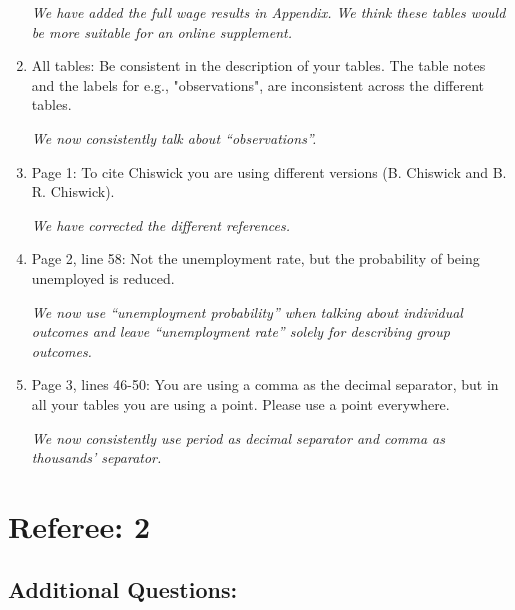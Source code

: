 \documentclass{article}
\newenvironment{response}
{\slshape}{}
\begin{document}
\begin{enumerate}
  \begin{response}
    We have added the full wage results in Appendix.  We think these
    tables would be more suitable for an online supplement.
  \end{response}
\item All tables: Be consistent in the description of your tables. The
table notes and the labels for e.g., "observations", are inconsistent
across the different tables. 

\begin{response}
  We now consistently talk about ``observations''.
\end{response}

\item Page 1: To cite Chiswick you are using different versions
(B. Chiswick and B. R. Chiswick).

\begin{response}
  We have corrected the different references.
\end{response}

\item Page 2, line 58: Not the unemployment rate, but the probability of
  being unemployed is reduced.

  \begin{response}
    We now use ``unemployment probability'' when talking about
    individual outcomes and leave ``unemployment rate'' solely for
    describing group outcomes.
  \end{response}

\item Page 3, lines 46-50: You are using a comma as the decimal separator, but in all your tables you are using a point. Please use a point everywhere. 

  \begin{response}
    We now consistently use period as decimal separator and comma as
    thousands' separator.
  \end{response}

\end{enumerate}



\section{Referee: 2}


\subsection{Additional Questions:}
\end{document}
